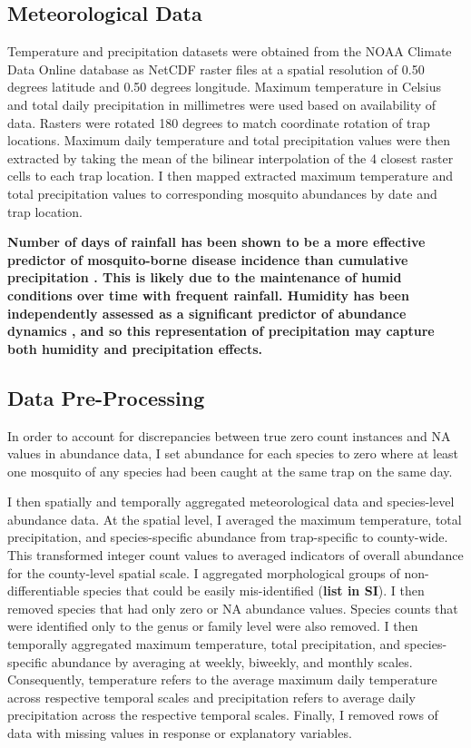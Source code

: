 \subsection{Meteorological Data}

Temperature and precipitation datasets were obtained from the NOAA Climate Data Online database as NetCDF raster files at a spatial resolution of 0.50 degrees latitude and 0.50 degrees longitude. Maximum temperature in Celsius and total daily precipitation in millimetres were used based on availability of data. Rasters were rotated 180 degrees to match coordinate rotation of trap locations. Maximum daily temperature and total precipitation values were then extracted by taking the mean of the bilinear interpolation of the 4 closest raster cells to each trap location. I then mapped extracted maximum temperature and total precipitation values to corresponding mosquito abundances by date and trap location. 

\textbf{Number of days of rainfall has been shown to be a more effective predictor of mosquito-borne disease incidence than cumulative precipitation \citep{Xu2017}. This is likely due to the maintenance of humid conditions over time with frequent rainfall. Humidity has been independently assessed as a significant predictor of abundance dynamics \citep{Trawinski2008}, and so this representation of precipitation may capture both humidity and precipitation effects.}

\subsection{Data Pre-Processing}

In order to account for discrepancies between true zero count instances and NA values in abundance data, I set abundance for each species to zero where at least one mosquito of any species had been caught at the same trap on the same day. 

I then spatially and temporally aggregated meteorological data and species-level abundance data. At the spatial level, I averaged the maximum temperature, total precipitation, and species-specific abundance from trap-specific to county-wide. This transformed integer count values to averaged indicators of overall abundance for the county-level spatial scale. I aggregated morphological groups of non-differentiable species that could be easily mis-identified (\textbf{list in SI}). I then removed species that had only zero or NA abundance values. Species counts that were identified only to the genus or family level were also removed. I then temporally aggregated maximum temperature, total precipitation, and species-specific abundance by averaging at weekly, biweekly, and monthly scales. Consequently, temperature refers to the average maximum daily temperature across respective temporal scales and precipitation refers to average daily precipitation across the respective temporal scales. Finally, I removed rows of data with missing values in response or explanatory variables. 

